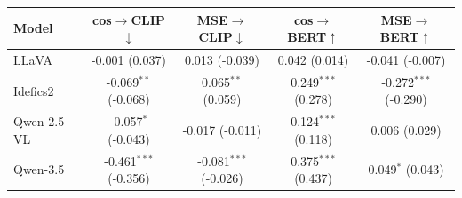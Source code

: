 \begin{tabular}{lcccc}
\toprule
Model & cos$\to$CLIP$\downarrow$ & MSE$\to$CLIP$\downarrow$ & cos$\to$BERT$\uparrow$ & MSE$\to$BERT$\uparrow$ \\
\midrule
LLaVA & -0.001 (0.037) & 0.013 (-0.039) & 0.042 (0.014) & -0.041 (-0.007) \\
Idefics2 & -0.069$^{**}$ (-0.068) & 0.065$^{**}$ (0.059) & 0.249$^{***}$ (0.278) & -0.272$^{***}$ (-0.290) \\
Qwen-2.5-VL & -0.057$^{*}$ (-0.043) & -0.017 (-0.011) & 0.124$^{***}$ (0.118) & 0.006 (0.029) \\
Qwen-3.5 & -0.461$^{***}$ (-0.356) & -0.081$^{***}$ (-0.026) & 0.375$^{***}$ (0.437) & 0.049$^{*}$ (0.043) \\
\bottomrule
\end{tabular}
